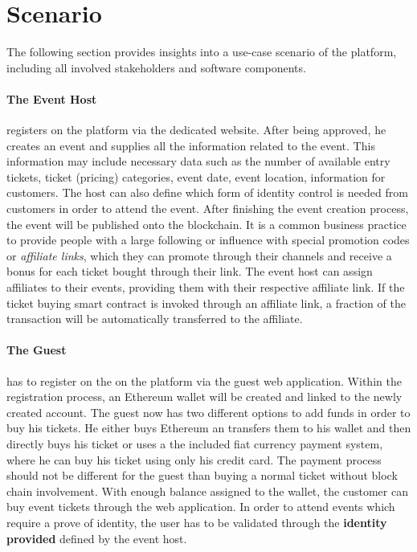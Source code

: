 \section{Scenario}
The following section provides insights into a use-case scenario of the platform, including all involved stakeholders and software components.

\paragraph{The Event Host} registers on the platform via the dedicated website. After being approved, he creates an event and supplies all the information related to the event. This information may include necessary data such as the number of available entry tickets, ticket (pricing) categories, event date, event location, information for customers. The host can also define which form of identity control is needed from customers in order to attend the event. After finishing the event creation process, the event will be published onto the blockchain.
It is a common business practice to provide people with a large following or influence with special promotion codes or \textit{affiliate links}, which they can promote through their channels and receive a bonus for each ticket bought through their link. The event host can assign affiliates to their events, providing them with their respective affiliate link. If the ticket buying smart contract is invoked through an affiliate link, a fraction of the transaction will be automatically transferred to the affiliate.  

\paragraph{The Guest} has to register on the on the platform via the guest web application. Within the registration process, an Ethereum wallet will be created and linked to the newly created account. The guest now has two different options to add funds in order to buy his tickets. He either buys Ethereum an transfers them to his wallet and then directly buys his ticket or uses a the included fiat currency payment system, where he can buy his ticket using only his credit card.
The payment process should not be different for the guest than buying a normal ticket without block chain involvement.
With enough balance assigned to the wallet, the customer can buy event tickets through the web application.
In order to attend events which require a prove of identity, the user has to be validated through the \textbf{identity provided} defined by the event host.


